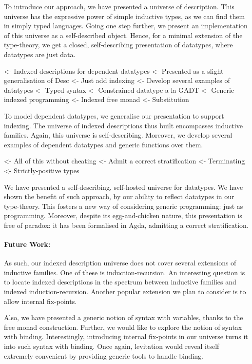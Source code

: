 \documentclass[preprint
              , authoryear
              ]{sigplanconf}
\newenvironment{wstructure}{\comment}{\endcomment}
\begin{document}
To introduce our approach, we have presented a universe of
description. This universe has the expressive power of simple
inductive types, as we can find them in simply typed languages. Going
one step further, we present an implementation of this universe as a
self-described object. Hence, for a minimal extension of the
type-theory, we get a closed, self-describing presentation of
datatypes, where datatypes are just data.

\begin{wstructure}
<- Indexed descriptions for dependent datatypes
    <- Presented as a slight generalisation of Desc
        <- Just add indexing
    <- Develop several examples of datatypes
        <- Typed syntax
        <- Constrained datatype a la GADT
    <- Generic indexed programming
        <- Indexed free monad
        <- Substitution
\end{wstructure}

To model dependent datatypes, we generalise our presentation to
support indexing. The universe of indexed descriptions thus built
encompasses inductive families. Again, this universe is
self-describing. Moreover, we develop several examples of dependent
datatypes and generic functions over them.

\begin{wstructure}
<- All of this without cheating
    <- Admit a correct stratification
    <- Terminating
    <- Strictly-positive types
\end{wstructure}

We have presented a self-describing, self-hosted universe for
datatypes. We have shown the benefit of such approach, by our ability
to reflect datatypes in our type-theory. This fosters a new way of
considering generic programming: just as programming. Moreover,
despite its egg-and-chicken nature, this presentation is free of
paradox: it has been formalised in Agda, admitting a correct
stratification.

\paragraph{Future Work:} As such, our indexed description universe does 
not cover several extensions of inductive families. One of these is
induction-recursion. An interesting question is to locate indexed
descriptions in the spectrum between inductive families and indexed
induction-recursion. Another popular extension we plan to consider is
to allow internal fix-points.

Also, we have presented a generic notion of syntax with variables,
thanks to the free monad construction. Further, we would like to
explore the notion of syntax with binding. Interestingly, introducing
internal fix-points in our universe turns it into such syntax with
binding. Once again, levitation would reveal itself extremely
convenient by providing generic tools to handle binding.
\end{document}
